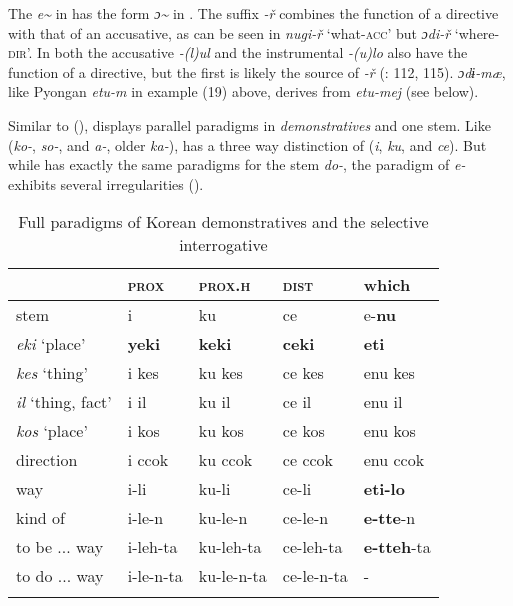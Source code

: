The  \textit{e{\textasciitilde}} in  has the form \textit{ɔ{\textasciitilde}} in . The  suffix \textit{-ř} combines the function of a directive with that of an accusative, as can be seen in \textit{nugi-ř} ‘what-\textsc{acc}’ but \textit{ɔdi-ř} ‘where-\textsc{dir}’. In  both the accusative \textit{-(l)ul} and the instrumental \textit{-(u)lo} also have the function of a directive, but the first is likely the source of  \textit{-ř} (\citealt{Song2005}: 112, 115).  \textit{ɔdɨ-mæ}, like Pyongan \textit{etu-m} in example (19) above, derives from  \textit{etu-mej} (see below).

Similar to  (),  displays parallel paradigms in \textit{demonstratives} and one  stem. Like  (\textit{ko-}, \textit{so-}, and \textit{a-}, older \textit{ka-}),  has a three way distinction of  (\textit{i}, \textit{ku}, and \textit{ce}). But while  has exactly the same paradigms for the  stem \textit{do-}, the paradigm of  \textit{e-} exhibits several irregularities ().

\begin{table}
\caption{Full paradigms of Korean demonstratives and the selective interrogative \citep[296]{Sohn1994}}
\label{tab:kore:10}

\begin{tabularx}{\textwidth}{XXXXl}
\lsptoprule
& \textbf{\textsc{prox}} & \textbf{\textsc{prox.h}} & \textbf{\textsc{dist}} & \textbf{which}\\
\midrule
stem & i & ku & ce & e-\textbf{nu}\\
\textit{eki} ‘place’ & \textbf{yeki} & \textbf{keki} & \textbf{ceki} & \textbf{eti}\\
\textit{kes} ‘thing’ & i kes & ku kes & ce kes & enu kes\\
\textit{il} ‘thing, fact’ & i il & ku il & ce il & enu il\\
\textit{kos} ‘place’ & i kos & ku kos & ce kos & enu kos\\
direction & i ccok & ku ccok & ce ccok & enu ccok\\
way & i-li & ku-li & ce-li & \textbf{eti-lo}\\
kind of & i-le-n & ku-le-n & ce-le-n & \textbf{e-tte}-n\\
to be ... way & i-leh-ta & ku-leh-ta & ce-leh-ta & \textbf{e-tteh}-ta\\
to do ... way & i-le-n-ta & ku-le-n-ta & ce-le-n-ta & -\\
\lspbottomrule
\end{tabularx}
\end{table}


